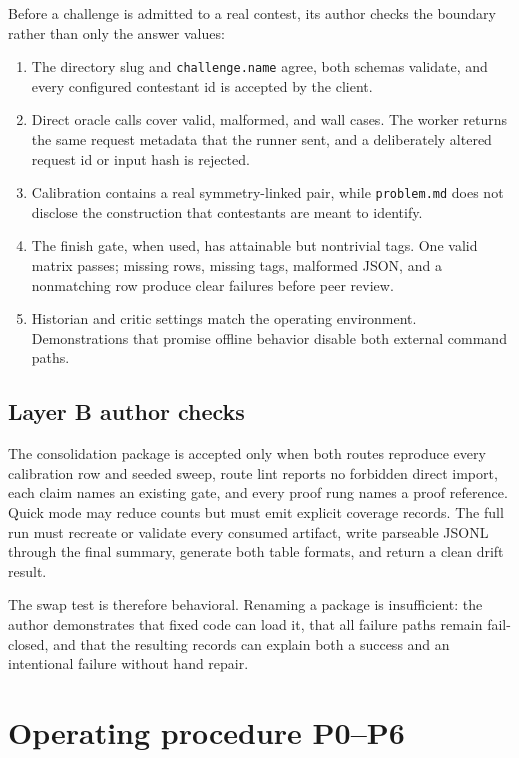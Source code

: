 \documentclass[11pt]{article}
\newcommand{\code}[1]{\texttt{#1}}
\begin{document}
Before a challenge is admitted to a real contest, its author checks the
boundary rather than only the answer values:

\begin{enumerate}[leftmargin=*,itemsep=0.2em]
\item The directory slug and \code{challenge.name} agree, both schemas
validate, and every configured contestant id is accepted by the client.
\item Direct oracle calls cover valid, malformed, and wall cases.  The worker
returns the same request metadata that the runner sent, and a deliberately
altered request id or input hash is rejected.
\item Calibration contains a real symmetry-linked pair, while
\code{problem.md} does not disclose the construction that contestants are
meant to identify.
\item The finish gate, when used, has attainable but nontrivial tags.  One
valid matrix passes; missing rows, missing tags, malformed JSON, and a
nonmatching row produce clear failures before peer review.
\item Historian and critic settings match the operating environment.
Demonstrations that promise offline behavior disable both external command
paths.
\end{enumerate}

\subsection{Layer B author checks}

The consolidation package is accepted only when both routes reproduce every
calibration row and seeded sweep, route lint reports no forbidden direct
import, each claim names an existing gate, and every proof rung names a proof
reference.  Quick mode may reduce counts but must emit explicit coverage
records.  The full run must recreate or validate every consumed artifact,
write parseable JSONL through the final summary, generate both table formats,
and return a clean drift result.

The swap test is therefore behavioral.  Renaming a package is insufficient:
the author demonstrates that fixed code can load it, that all failure paths
remain fail-closed, and that the resulting records can explain both a success
and an intentional failure without hand repair.

\section{Operating procedure P0--P6}
\end{document}
